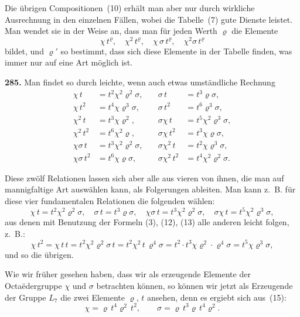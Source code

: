\documentclass[12pt,a4paper]{article}
\begin{document}
Die \"ubrigen Compositionen~(10) erh\"alt man aber nur durch wirkliche Ausrechnung in den einzelnen F\"allen, wobei die Tabelle~(7) gute Dienste leistet. Man wendet sie in der Weise an, dass man f\"ur jeden Werth $\varrho$ die Elemente
\[
\chi\,t^{\varrho},\quad \chi^2\,t^{\varrho},\quad \chi\,\sigma\,t^{\varrho},\quad \chi^2\sigma\,t^{\varrho}
\]
bildet, und $\varrho'$ so bestimmt, dass sich diese Elemente in der Tabelle finden, was immer nur auf eine Art m\"oglich ist.

\bigskip
\noindent\textbf{285.} Man findet so durch leichte, wenn auch etwas umst\"andliche Rechnung
\begin{equation}
\tag{15}
\begin{aligned}
\chi\,t &= t^2\chi^2\varrho^2\sigma,\quad &\sigma\,t &= t^3\varrho\sigma,\\
\chi\,t^2 &= t^4\chi\varrho^3\sigma,\quad &\sigma\,t^2 &= t^6\varrho^3\sigma,\\
\chi^2\,t &= t^3\chi\varrho^2,\quad &\sigma\chi\,t &= t^5\chi^2\varrho^3\sigma,\\
\chi^2\,t^2 &= t^6\chi^2\varrho,\quad &\sigma\chi\,t^2 &= t^3\chi\varrho\sigma,\\
\chi\sigma\,t &= t^3\chi^2\varrho^2\sigma,\quad &\sigma\chi^2\,t &= t^2\chi\varrho^3\sigma,\\
\chi\sigma\,t^2 &= t^6\chi\varrho\sigma,\quad &\sigma\chi^2\,t^2 &= t^4\chi^2\varrho^2\sigma.
\end{aligned}
\end{equation}

Diese zw\"olf Relationen lassen sich aber alle aus vieren von ihnen, die man auf mannigfaltige Art ausw\"ahlen kann, als Folgerungen ableiten. Man kann z.~B. f\"ur diese vier fundamentalen Relationen die folgenden w\"ahlen:
\begin{equation}
\tag{16}
\chi\,t = t^2\chi^2\varrho^2\sigma,\quad
\sigma\,t = t^3\varrho\sigma,\quad
\chi\sigma\,t = t^3\chi^2\varrho^2\sigma,\quad
\sigma\chi\,t = t^5\chi^2\varrho^3\sigma,
\end{equation}
aus denen mit Benutzung der Formeln (3), (12), (13) alle anderen leicht folgen, z.~B.:
\[
\chi\,t^2 = \chi\,t\,t = t^2\chi^2\varrho^2\sigma\,t = t^2\chi^2\,t\,\varrho^4\sigma
= t^2\cdot t^3\chi\varrho^2\cdot\varrho^4\sigma = t^5\chi\varrho^3\sigma,
\]
und so die \"ubrigen.

Wie wir fr\"uher gesehen haben, dass wir als erzeugende Elemente der Octa\"edergruppe $\chi$ und $\sigma$ betrachten k\"onnen, so k\"onnen wir jetzt als Erzeugende der Gruppe $L_7$ die zwei Elemente $\varrho$, $t$ ansehen, denn es ergiebt sich aus~(15):
\begin{equation}
\tag{17}
\chi = \varrho\,t^4\varrho^2\,t^2,\qquad \sigma = \varrho\,t^3\varrho\,t^4\varrho^2.
\end{equation}
\end{document}
